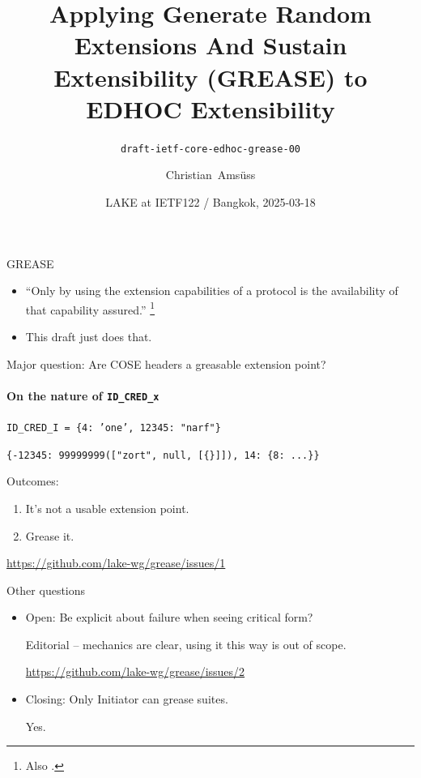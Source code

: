 

\title[Applying GREASE to EDHOC]{Applying Generate Random Extensions And Sustain Extensibility (GREASE) to EDHOC Extensibility}
\subtitle{\texttt{draft-ietf-core-edhoc-grease-00}}
\author{Christian~Amsüss}
\date{LAKE at IETF122 / Bangkok, 2025-03-18}



\frame{\titlepage}

\begin{frame}{GREASE}\Large
  \begin{itemize}
    \item ``Only by using the extension capabilities of a protocol is the availability of that capability assured.'' \footnote{Also .}
    \item This draft just does that.
  \end{itemize}
\end{frame}

\begin{frame}{Major question: Are COSE headers a greasable extension point?}\framesubtitle{On the nature of \texttt{ID\_CRED\_x}}\Large
  \texttt{ID\_CRED\_I = \{4: 'one', 12345: "narf"\}}

  \texttt{\{-12345: 99999999(["zort", null, [\{\}]]), 14: \{8: ...\}\}}

  \bigskip

  Outcomes:

  \begin{enumerate}
    \item It's not a usable extension point.
    \item Grease it.
  \end{enumerate}

  \vfill

  {\footnotesize{\url{https://github.com/lake-wg/grease/issues/1}}}
\end{frame}

\begin{frame}{Other questions}\Large
  \begin{itemize}
    \item Open: Be explicit about failure when seeing critical form?

      \bigskip

      Editorial -- mechanics are clear, using it this way is out of scope.

      {\footnotesize{\url{https://github.com/lake-wg/grease/issues/2}}}

      \bigskip

    \item Closing: Only Initiator can grease suites.

      \bigskip

      Yes.

      \bigskip
  \end{itemize}
\end{frame}

